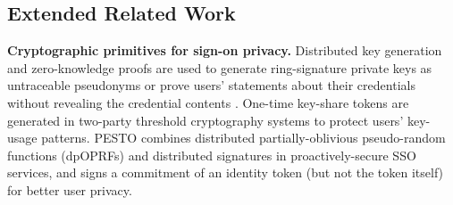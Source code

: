 \begin{comment}
Although \usso\ employs the same mathematical algorithms in its identity transformations as the OPRF protocol \cite{oprf-proved,voprf-proved}, we prove more properties of these algorithms to ensure security and privacy. %
\usso\ depends on the \emph{obliviousness} property to ensure IdP untraceability, %
the \emph{deterministicness} property of \emph{pseudo-random} functions to enable the RP to derive a permanent account for any $t$, and the \emph{randomness} property to provide RP unlinkability. %
Last but not least, \usso\ requires an additional property for SSO services, called \emph{RP designation}.
It is satisfied \emph{only if} no collision exists in RPs' pseudo-identities (see Lemma 1), which are actually the blinded inputs of the evaluated pseudo-random function \cite{oprf-proved,voprf-proved}.
This property %
is not explicitly required in other OPRF-based solutions and therefore may not be supported by all OPRF protocols. Thus, an OPRF protocol is not always ready to implement identity transformations in \usso, unless no collision exists in the blinded inputs.



\end{comment}

\subsection{Extended Related Work}
\noindent\textbf{Cryptographic primitives for sign-on privacy.}
Distributed key generation and zero-knowledge proofs are used to generate ring-signature private keys as untraceable pseudonyms \cite{crypto-book} or prove users' statements about their credentials without revealing the credential contents \cite{zklaim}.
One-time key-share tokens \cite{tandem} are generated in two-party threshold cryptography systems to protect users' key-usage patterns.
PESTO \cite{pesto} combines distributed partially-oblivious pseudo-random functions (dpOPRFs) and distributed signatures in proactively-secure SSO services, and signs a commitment of an identity token (but not the token itself) for better user privacy.

